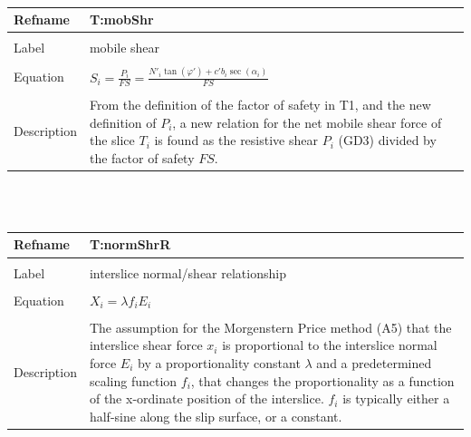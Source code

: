 \documentclass[12pt]{article}
\begin{document}
~\newline
\noindent \begin{minipage}{\textwidth}
\begin{tabular}{p{} p{}}
\toprule \textbf{Refname} & \textbf{T:mobShr}
\label{T:mobShr}
\\ \midrule \\
Label & mobile shear
\\ \midrule \\
Equation & $S_{i}=\frac{P_{i}}{FS}=\frac{N'_{i}\tan\left(\varphi{}'\right)+c'b_{i}\sec\left(\alpha{}_{i}\right)}{FS}$
\\ \midrule \\
Description & From the definition of the factor of safety in T1, and the new definition of $P_{i}$, a new relation for the net mobile shear force of the slice $T_{i}$ is found as the resistive shear $P_{i}$ (GD3) divided by the factor of safety $FS$.
\\ \bottomrule \end{tabular}
\end{minipage}\\
~\newline
\noindent \begin{minipage}{\textwidth}
\begin{tabular}{p{} p{}}
\toprule \textbf{Refname} & \textbf{T:normShrR}
\label{T:normShrR}
\\ \midrule \\
Label & interslice normal/shear relationship
\\ \midrule \\
Equation & $X_{i}=\lambda{}f_{i}E_{i}$
\\ \midrule \\
Description & The assumption for the Morgenstern Price method (A5) that the interslice shear force $x_{i}$ is proportional to the interslice normal force $E_{i}$ by a proportionality constant $\lambda{}$ and a predetermined scaling function $f_{i}$, that changes the proportionality as a function of the x-ordinate position of the interslice. $f_{i}$ is typically either a half-sine along the slip surface, or a constant.
\\ \bottomrule \end{tabular}
\end{minipage}\\
~\newline
\end{document}
